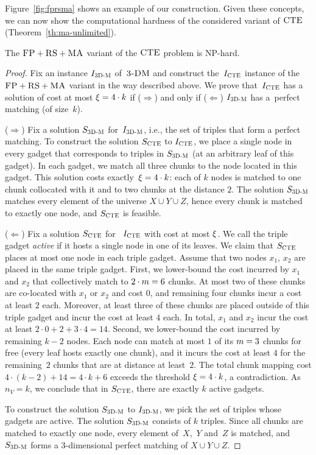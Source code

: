 Figure~\ref{fig:fprsma} shows an example of our construction.
Given these concepts, we can now show the computational hardness of the considered variant of $\textsc{CTE}$ (Theorem~\ref{th:ma-unlimited}).
\newpage
\begin{theorem}
  The $\textsc{FP}+\textsc{RS}+\textsc{MA}$ variant of the $\textsc{CTE}$ problem is NP-hard.
  \label{th:ma-unlimited}
\end{theorem}
\begin{proof}
Fix an instance $I_{\mathrm{\textsc{3D-M}}}$ of~$\textsc{3-DM}$ and construct the~$I_{\mathrm{\textsc{CTE}}}$ instance of
the~$\textsc{FP}+\textsc{RS}+\textsc{MA}$ variant in the way described above. We prove that~$I_{\mathrm{\textsc{CTE}}}$ has a solution of cost at most $\xi = 4 \cdot k$ if ($\Rightarrow$) and only if
($\Leftarrow$)
$I_{\mathrm{\textsc{3D-M}}}$ has a~perfect matching (of size~$k$).

\medskip

($\Rightarrow$) Fix a solution $S_{\mathrm{\textsc{3D-M}}}$ for~$I_{\mathrm{\textsc{3D-M}}}$, i.e., the set of triples that form a perfect matching. To construct the solution $S_{\mathrm{\textsc{CTE}}}$ to $I_{\mathrm{\textsc{CTE}}}$, we place a single node in every
gadget that corresponds to triples in $S_{\mathrm{\textsc{3D-M}}}$ (at an arbitrary leaf of this gadget). In each gadget, we match all three chunks to the node located in this gadget. This
solution costs exactly~$\xi = 4\cdot k$: each of $k$ nodes is matched to one chunk collocated with it and to two chunks at the distance $2$.
The solution $S_{\mathrm{\textsc{3D-M}}}$ matches every element of the universe $X \cup Y \cup Z$, hence every chunk is matched to exactly one node, and $S_{\mathrm{\textsc{CTE}}}$ is feasible.

\medskip

($\Leftarrow$) Fix a solution $S_{\mathrm{\textsc{CTE}}}$ for ~$I_{\mathrm{\textsc{CTE}}}$ with cost at most $\xi$.
We call the triple gadget \emph{active} if it hosts a single node in one of its leaves.
We claim that $S_{\mathrm{\textsc{CTE}}}$ places at most one node in each triple gadget.
Assume that two nodes $x_1$, $x_2$ are placed in the same triple gadget.
First, we lower-bound the cost incurred by $x_1$ and $x_2$ that collectively match to $2\cdot m = 6$ chunks.
At most two of these chunks are co-located with $x_1$ or $x_2$ and cost $0$, and remaining four chunks incur a cost at least $2$ each.
Moreover, at least three of these chunks are placed outside of this triple gadget and incur the cost at least $4$ each.
In total, $x_1$ and $x_2$ incur the cost at least $2\cdot 0+2+3\cdot 4=14$.
Second, we lower-bound the cost incurred by remaining $k-2$ nodes.
Each node can match at most $1$ of its $m=3$ chunks for free (every leaf hosts exactly one chunk),
and it incurs the cost at least $4$ for the remaining~$2$ chunks that are at distance at least~$2$.
The total chunk mapping cost $4\cdot (k-2)+14 = 4\cdot k + 6$ exceeds the threshold $\xi = 4\cdot k$, a contradiction.
As $n_V = k$, we conclude that in $S_{\mathrm{\textsc{CTE}}}$, there are exactly $k$ active gadgets.

To construct the solution $S_{\mathrm{\textsc{3D-M}}}$ to $I_{\mathrm{\textsc{3D-M}}}$, we pick the set of triples whose gadgets are active.
The solution $S_{\mathrm{\textsc{3D-M}}}$ consists of $k$ triples.
Since all chunks are matched to exactly one node, every element of~$X$,~$Y$ and~$Z$ is matched, and $S_{\mathrm{\textsc{3D-M}}}$ forms a 3-dimensional perfect matching of $X \cup Y\cup Z$.
\end{proof}

